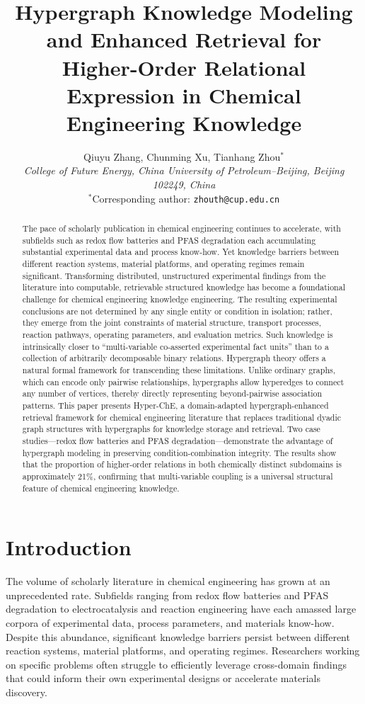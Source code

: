 \documentclass[11pt,a4paper]{article}
\title{Hypergraph Knowledge Modeling and Enhanced Retrieval for Higher-Order Relational Expression in Chemical Engineering Knowledge}
\author{
  Qiuyu Zhang,
  Chunming Xu,
  Tianhang Zhou$^*$
  \\
  \textit{College of Future Energy, China University of Petroleum--Beijing, Beijing 102249, China}
  \\
  $^*$Corresponding author: \texttt{zhouth@cup.edu.cn}
}
\date{}
\begin{document}
\maketitle

\begin{abstract}
The pace of scholarly publication in chemical engineering continues to accelerate, with subfields such as redox flow batteries and PFAS degradation each accumulating substantial experimental data and process know-how. Yet knowledge barriers between different reaction systems, material platforms, and operating regimes remain significant. Transforming distributed, unstructured experimental findings from the literature into computable, retrievable structured knowledge has become a foundational challenge for chemical engineering knowledge engineering. The resulting experimental conclusions are not determined by any single entity or condition in isolation; rather, they emerge from the joint constraints of material structure, transport processes, reaction pathways, operating parameters, and evaluation metrics. Such knowledge is intrinsically closer to ``multi-variable co-asserted experimental fact units'' than to a collection of arbitrarily decomposable binary relations. Hypergraph theory offers a natural formal framework for transcending these limitations. Unlike ordinary graphs, which can encode only pairwise relationships, hypergraphs allow hyperedges to connect any number of vertices, thereby directly representing beyond-pairwise association patterns. This paper presents Hyper-ChE, a domain-adapted hypergraph-enhanced retrieval framework for chemical engineering literature that replaces traditional dyadic graph structures with hypergraphs for knowledge storage and retrieval. Two case studies---redox flow batteries and PFAS degradation---demonstrate the advantage of hypergraph modeling in preserving condition-combination integrity. The results show that the proportion of higher-order relations in both chemically distinct subdomains is approximately 21\%, confirming that multi-variable coupling is a universal structural feature of chemical engineering knowledge.
\end{abstract}

\section{Introduction}
\label{sec:introduction}

The volume of scholarly literature in chemical engineering has grown at an unprecedented rate. Subfields ranging from redox flow batteries and PFAS degradation to electrocatalysis and reaction engineering have each amassed large corpora of experimental data, process parameters, and materials know-how. Despite this abundance, significant knowledge barriers persist between different reaction systems, material platforms, and operating regimes. Researchers working on specific problems often struggle to efficiently leverage cross-domain findings that could inform their own experimental designs or accelerate materials discovery.
\end{document}

